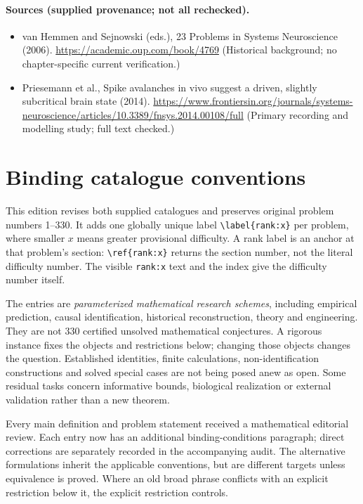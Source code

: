 \documentclass[11pt]{article}
\begin{document}
\paragraph{Sources (supplied provenance; not all rechecked).} \begin{itemize}
\item van Hemmen and Sejnowski (eds.), 23 Problems in Systems Neuroscience (2006). \url{https://academic.oup.com/book/4769} (Historical background; no chapter-specific current verification.)
\item Priesemann et al., Spike avalanches in vivo suggest a driven, slightly subcritical brain state (2014). \url{https://www.frontiersin.org/journals/systems-neuroscience/articles/10.3389/fnsys.2014.00108/full} (Primary recording and modelling study; full text checked.)
\end{itemize}


\section*{Binding catalogue conventions}
This edition revises both supplied catalogues and preserves original problem numbers 1--330. It adds one globally unique label \verb|\label{rank:x}| per problem, where smaller $x$ means greater provisional difficulty. A rank label is an anchor at that problem's section: \verb|\ref{rank:x}| returns the section number, not the literal difficulty number. The visible \texttt{rank:x} text and the index give the difficulty number itself.

The entries are \emph{parameterized mathematical research schemes}, including empirical prediction, causal identification, historical reconstruction, theory and engineering. They are not 330 certified unsolved mathematical conjectures. A rigorous instance fixes the objects and restrictions below; changing those objects changes the question. Established identities, finite calculations, non-identification constructions and solved special cases are not being posed anew as open. Some residual tasks concern informative bounds, biological realization or external validation rather than a new theorem.

Every main definition and problem statement received a mathematical editorial review. Each entry now has an additional binding-conditions paragraph; direct corrections are separately recorded in the accompanying audit. The alternative formulations inherit the applicable conventions, but are different targets unless equivalence is proved. Where an old broad phrase conflicts with an explicit restriction below it, the explicit restriction controls.
\end{document}
